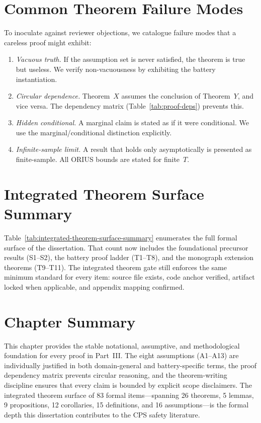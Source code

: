 \section{Common Theorem Failure Modes}

To inoculate against reviewer objections, we catalogue failure modes
that a careless proof might exhibit:

\begin{enumerate}
  \item \emph{Vacuous truth.}  If the assumption set is never satisfied,
    the theorem is true but useless.  We verify non-vacuousness by
    exhibiting the battery instantiation.
  \item \emph{Circular dependence.}  Theorem~$X$ assumes the conclusion
    of Theorem~$Y$, and vice versa.  The dependency matrix
    (Table~\ref{tab:proof-deps}) prevents this.
  \item \emph{Hidden conditional.}  A marginal claim is stated as if it
    were conditional.  We use the marginal/conditional distinction
    explicitly.
  \item \emph{Infinite-sample limit.}  A result that holds only
    asymptotically is presented as finite-sample.  All ORIUS bounds
    are stated for finite~$T$.
\end{enumerate}

\section{Integrated Theorem Surface Summary}

Table~\ref{tab:integrated-theorem-surface-summary} enumerates the full
formal surface of the dissertation.  That count now includes the
foundational precursor results (S1--S2), the battery proof ladder (T1--T8),
and the monograph extension theorems (T9--T11).  The integrated theorem gate
still enforces the same minimum standard for every item: source file exists,
code anchor verified, artifact locked when applicable, and appendix mapping
confirmed.


\section{Chapter Summary}

This chapter provides the stable notational, assumptive, and
methodological foundation for every proof in Part~III.  The eight
assumptions (A1--A13) are individually justified in both domain-general
and battery-specific terms, the proof dependency matrix prevents
circular reasoning, and the theorem-writing discipline ensures that
every claim is bounded by explicit scope disclaimers.  The integrated
theorem surface of 83 formal items---spanning 26 theorems, 5 lemmas,
9 propositions, 12 corollaries, 15 definitions, and 16 assumptions---is
the formal depth this dissertation contributes to the CPS safety
literature.
